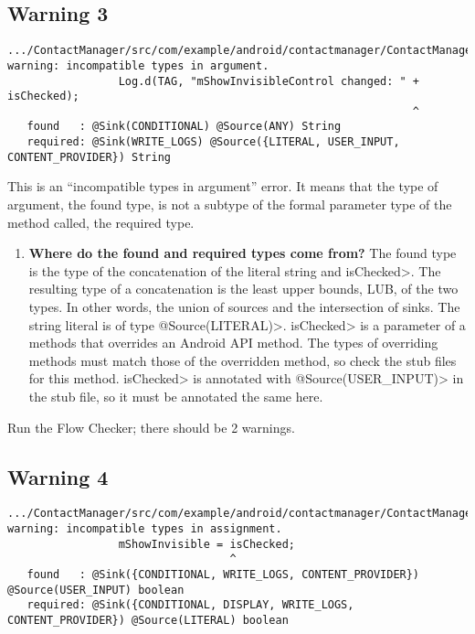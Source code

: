   \subsection{Warning 3 }
   \begin{Verbatim}
.../ContactManager/src/com/example/android/contactmanager/ContactManager.java:74: 
warning: incompatible types in argument.
                 Log.d(TAG, "mShowInvisibleControl changed: " + isChecked);
                                                              ^
   found   : @Sink(CONDITIONAL) @Source(ANY) String
   required: @Sink(WRITE_LOGS) @Source({LITERAL, USER_INPUT, CONTENT_PROVIDER}) String
\end{Verbatim} 
This is an ``incompatible types in argument'' error.  It means that the type
of argument, the found type, is not a subtype of the formal 
parameter type of the method called, the required type.
 \begin{enumerate}

\item\textbf{Where do the found and required types come from?}
The found type is the type of the concatenation of the literal string and \<isChecked>.  The
resulting type of a concatenation is the least upper bounds, LUB, of the two types.   In other 
words, the union of sources and the intersection of sinks.  The string literal is of type 
\<@Source(LITERAL)>.  \<isChecked> is a parameter of a methods that overrides an
Android API method.  The types of overriding methods must match those of the overridden
method, so check the stub files for this method.  \<isChecked> is annotated with 
\<@Source(USER\_INPUT)>  in the stub file, so it must be annotated the same here.\newline

 \end{enumerate}

Run the Flow Checker; there should be 2 warnings.
  
  \subsection{Warning 4 }
   \begin{Verbatim}
.../ContactManager/src/com/example/android/contactmanager/ContactManager.java:77: 
warning: incompatible types in assignment.
                 mShowInvisible = isChecked;
                                  ^
   found   : @Sink({CONDITIONAL, WRITE_LOGS, CONTENT_PROVIDER}) @Source(USER_INPUT) boolean
   required: @Sink({CONDITIONAL, DISPLAY, WRITE_LOGS, CONTENT_PROVIDER}) @Source(LITERAL) boolean
    \end{Verbatim} 

